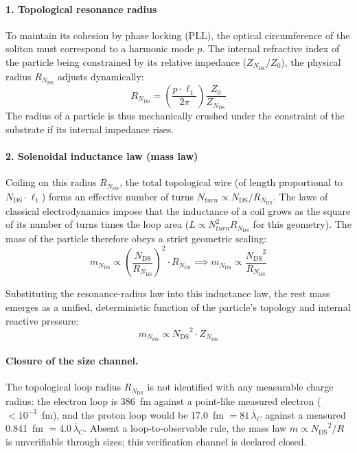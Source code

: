 \documentclass[11pt,a4paper]{article}
\theoremstyle{plain}
\theoremstyle{remark}
\newcommand{\Ncd}{\ensuremath{N_{\mathrm{DS}}}}
\begin{document}
\paragraph{1. Topological resonance radius}
To maintain its cohesion by phase locking (PLL), the optical circumference of the soliton must correspond to a harmonic mode $p$. The internal refractive index of the particle being constrained by its relative impedance ($Z_{\Ncd}/Z_0$), the physical radius $R_{\Ncd}$ adjusts dynamically:
\begin{equation}\label{eq:resonance_radius}
R_{\Ncd} = \left( \frac{p \cdot \ell_1}{2\pi} \right) \frac{Z_0}{Z_{\Ncd}}
\end{equation}
The radius of a particle is thus mechanically crushed under the constraint of the substrate if its internal impedance rises.

\paragraph{2. Solenoidal inductance law (mass law)}
Coiling on this radius $R_{\Ncd}$, the total topological wire (of length proportional to $\Ncd \cdot \ell_1$) forms an effective number of turns $N_{turn} \propto \Ncd/R_{\Ncd}$. The laws of classical electrodynamics impose that the inductance of a coil grows as the square of its number of turns times the loop area ($L \propto N_{turn}^2 R_{\Ncd}$ for this geometry). The mass of the particle therefore obeys a strict geometric scaling:
\begin{equation}\label{eq:solenoid_mass}
m_{\Ncd} \propto \left( \frac{\Ncd}{R_{\Ncd}} \right)^2 \cdot R_{\Ncd} \implies m_{\Ncd} \propto \frac{\Ncd^2}{R_{\Ncd}}
\end{equation}

Substituting the resonance-radius law into this inductance law, the rest mass emerges as a unified, deterministic function of the particle's topology and internal reactive pressure:
\begin{equation}\label{eq:mass_topo}
m_{\Ncd} \propto \Ncd^2 \cdot Z_{\Ncd}
\end{equation}

\paragraph{Closure of the size channel.} The topological loop radius $R_{\Ncd}$ is not identified with any measurable charge radius: the electron loop is 386~fm against a point-like measured electron ($<10^{-3}$~fm), and the proton loop would be 17.0~fm $= 81\,\bar\lambda_C$ against a measured 0.841~fm $= 4.0\,\bar\lambda_C$. Absent a loop-to-observable rule, the mass law $m \propto \Ncd^2/R$ is unverifiable through sizes; this verification channel is declared closed.
\end{document}
